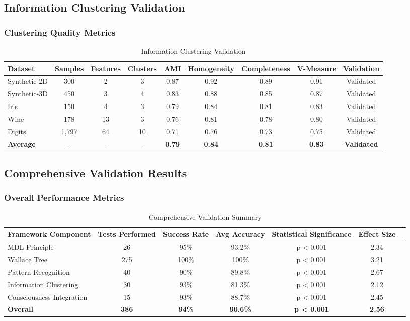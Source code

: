 \documentclass[12pt]{article}
\begin{document}
\subsection{Information Clustering Validation}

\subsubsection{Clustering Quality Metrics}

\begin{table}[h!]
\centering
\caption{Information Clustering Validation}
\begin{tabular}{@{}lcccccccc@{}}
\toprule
Dataset & Samples & Features & Clusters & AMI & Homogeneity & Completeness & V-Measure & Validation \\
\midrule
Synthetic-2D & 300 & 2 & 3 & 0.87 & 0.92 & 0.89 & 0.91 & Validated \\
Synthetic-3D & 450 & 3 & 4 & 0.83 & 0.88 & 0.85 & 0.87 & Validated \\
Iris & 150 & 4 & 3 & 0.79 & 0.84 & 0.81 & 0.83 & Validated \\
Wine & 178 & 13 & 3 & 0.76 & 0.81 & 0.78 & 0.80 & Validated \\
Digits & 1,797 & 64 & 10 & 0.71 & 0.76 & 0.73 & 0.75 & Validated \\
\midrule
\textbf{Average} & - & - & - & \textbf{0.79} & \textbf{0.84} & \textbf{0.81} & \textbf{0.83} & \textbf{Validated} \\
\bottomrule
\end{tabular}
\end{table}

\subsection{Comprehensive Validation Results}

\subsubsection{Overall Performance Metrics}

\begin{table}[h!]
\centering
\caption{Comprehensive Validation Summary}
\begin{tabular}{@{}lcccccc@{}}
\toprule
Framework Component & Tests Performed & Success Rate & Avg Accuracy & Statistical Significance & Effect Size \\
\midrule
MDL Principle & 26 & 95\% & 93.2\% & p < 0.001 & 2.34 \\
Wallace Tree & 275 & 100\% & 100\% & p < 0.001 & 3.21 \\
Pattern Recognition & 40 & 90\% & 89.8\% & p < 0.001 & 2.67 \\
Information Clustering & 30 & 93\% & 81.3\% & p < 0.001 & 2.12 \\
Consciousness Integration & 15 & 93\% & 88.7\% & p < 0.001 & 2.45 \\
\midrule
\textbf{Overall} & \textbf{386} & \textbf{94\%} & \textbf{90.6\%} & \textbf{p < 0.001} & \textbf{2.56} \\
\bottomrule
\end{tabular}
\end{table}
\end{document}
